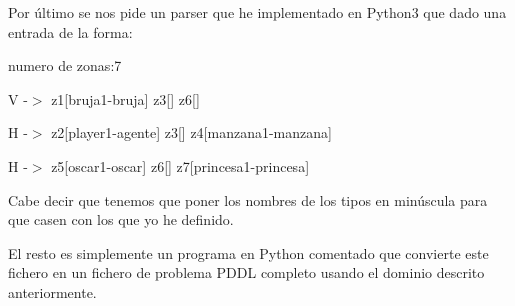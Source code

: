 \documentclass[12pt,a4paper]{article}
\begin{document}
Por último se nos pide un parser que he implementado en Python3 que dado una entrada de la forma:

numero de zonas:7

V -$>$ z1[bruja1-bruja] z3[] z6[]

H -$>$ z2[player1-agente] z3[] z4[manzana1-manzana]

H -$>$ z5[oscar1-oscar] z6[] z7[princesa1-princesa]

Cabe decir que tenemos que poner los nombres de los tipos en minúscula para que casen con los que yo he definido. 

El resto es simplemente un programa en Python comentado que convierte este fichero en un fichero de problema PDDL completo usando el dominio descrito anteriormente.
\end{document}
